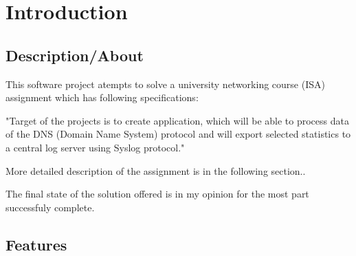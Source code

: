 


\section{Introduction}

\subsection{Description/About}



This software project atempts to solve a university networking course (ISA) assignment
which has following specifications:

"Target of the projects is to create application, which will be able to process data of the DNS (Domain Name System)
protocol and will export selected statistics to a central log server using Syslog protocol."

More detailed description of the assignment is in the following section..

The final state of the solution offered is in my opinion for the most part successfuly complete.

\subsection{Features}

